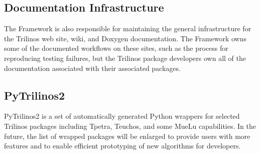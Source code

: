 \subsection{Documentation Infrastructure}

The Framework is also responsible for maintaining the general infrastructure for the Trilinos web site, wiki, and Doxygen documentation. The Framework owns some of the documented workflows on these sites, such as the process for reproducing testing failures, but the Trilinos package developers own all of the documentation associated with their associated packages.


\subsection{PyTrilinos2}

PyTrilinos2 is a set of automatically generated Python wrappers for selected Trilinos packages including Tpetra, Teuchos, and some MueLu capabilities. In the future, the list of wrapped packages will be enlarged to provide users with more features and to enable efficient prototyping of new algorithms for developers.

